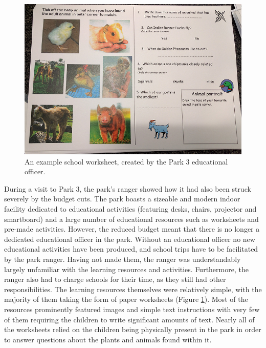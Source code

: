 \begin{figure}
  \centering
  \includegraphics[width=0.8\columnwidth]{images/chapter04/worksheet.jpg}
  \caption[An existing park worksheet]{An example school worksheet, created by the Park 3 educational officer.}
  \label{fig:worksheet}
\end{figure}

During a visit to Park 3, the park's ranger showed how it had also been struck severely by the budget cuts. The park boasts a sizeable and modern indoor facility dedicated to educational activities (featuring desks, chairs, projector and smartboard) and a large number of educational resources such as worksheets and pre-made activities. However, the reduced budget meant that there is no longer a dedicated educational officer in the park. Without an educational officer no new educational activities have been produced, and school trips have to be facilitated by the park ranger. Having not made them, the ranger was understandably largely unfamiliar with the learning resources and activities. Furthermore, the ranger also had to charge schools for their time, as they still had other responsibilities. The learning resources themselves were relatively simple, with the majority of them taking the form of paper worksheets (Figure \ref{fig:worksheet}). Most of the resources prominently featured images and simple text instructions with very few of them requiring the children to write significant amounts of text. Nearly all of the worksheets relied on the children being physically present in the park in order to answer questions about the plants and animals found within it.


